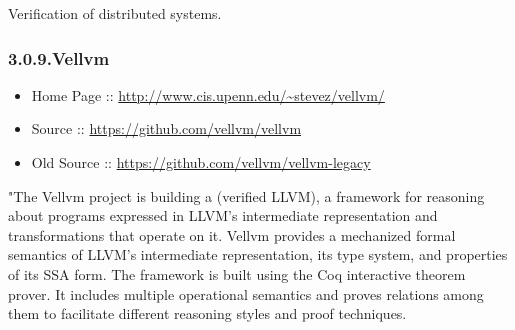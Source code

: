 \documentclass[12pt,twoside]{article}
\begin{document}
\noindent{}Verification of distributed systems.%

\subsubsection{3.0.9.\hspace*{0.5em}Vellvm}\label{sec-vellvm}%

\begin{itemize}[noitemsep,topsep=\mdcompacttopsep]%

\item{}Home Page :: \href{http://www.cis.upenn.edu/~stevez/vellvm/}{{\ttfamily http://\hspace{0pt}www.\hspace{0pt}cis.\hspace{0pt}upenn.\hspace{0pt}edu/\hspace{0pt}\textasciitilde{}stevez/\hspace{0pt}vellvm/\hspace{0pt}}}%

\item{}Source :: \href{https://github.com/vellvm/vellvm}{{\ttfamily https://\hspace{0pt}github.\hspace{0pt}com/\hspace{0pt}vellvm/\hspace{0pt}vellvm}}%

\item{}Old Source :: \href{https://github.com/vellvm/vellvm-legacy}{{\ttfamily https://\hspace{0pt}github.\hspace{0pt}com/\hspace{0pt}vellvm/\hspace{0pt}vellvm-\hspace{0pt}legacy}}%
\end{itemize}%

\noindent{}"The Vellvm project is building a (verified LLVM), a framework for
reasoning about programs expressed in LLVM's intermediate
representation and transformations that operate on it. Vellvm provides
a mechanized formal semantics of LLVM's intermediate representation,
its type system, and properties of its SSA form. The framework is
built using the Coq interactive theorem prover. It includes multiple
operational semantics and proves relations among them to facilitate
different reasoning styles and proof techniques.%
\end{document}
